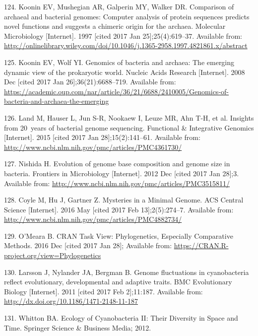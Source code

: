 \documentclass[12pt,twoside]{reedthesis}
\begin{document}
  \hypertarget{ref-koonin_comparison_1997}{}
  124. Koonin EV, Mushegian AR, Galperin MY, Walker DR. Comparison of
  archaeal and bacterial genomes: Computer analysis of protein sequences
  predicts novel functions and suggests a chimeric origin for the archaea.
  Molecular Microbiology {[}Internet{]}. 1997 {[}cited 2017 Jan
  25{]};25(4):619--37. Available from:
  \url{http://onlinelibrary.wiley.com/doi/10.1046/j.1365-2958.1997.4821861.x/abstract}
  
  \hypertarget{ref-koonin_genomics_2008}{}
  125. Koonin EV, Wolf YI. Genomics of bacteria and archaea: The emerging
  dynamic view of the prokaryotic world. Nucleic Acids Research
  {[}Internet{]}. 2008 Dec {[}cited 2017 Jan 26{]};36(21):6688--719.
  Available from:
  \url{https://academic.oup.com/nar/article/36/21/6688/2410005/Genomics-of-bacteria-and-archaea-the-emerging}
  
  \hypertarget{ref-land_insights_2015}{}
  126. Land M, Hauser L, Jun S-R, Nookaew I, Leuze MR, Ahn T-H, et al.
  Insights from 20~years of bacterial genome sequencing. Functional \&
  Integrative Genomics {[}Internet{]}. 2015 {[}cited 2017 Jan
  28{]};15(2):141--61. Available from:
  \url{http://www.ncbi.nlm.nih.gov/pmc/articles/PMC4361730/}
  
  \hypertarget{ref-nishida_evolution_2012}{}
  127. Nishida H. Evolution of genome base composition and genome size in
  bacteria. Frontiers in Microbiology {[}Internet{]}. 2012 Dec {[}cited
  2017 Jan 28{]};3. Available from:
  \url{http://www.ncbi.nlm.nih.gov/pmc/articles/PMC3515811/}
  
  \hypertarget{ref-coyle_mysteries_2016}{}
  128. Coyle M, Hu J, Gartner Z. Mysteries in a Minimal Genome. ACS
  Central Science {[}Internet{]}. 2016 May {[}cited 2017 Feb
  13{]};2(5):274--7. Available from:
  \url{http://www.ncbi.nlm.nih.gov/pmc/articles/PMC4882734/}
  
  \hypertarget{ref-omeara_cran_2016}{}
  129. O'Meara B. CRAN Task View: Phylogenetics, Especially Comparative
  Methods. 2016 Dec {[}cited 2017 Jan 28{]}; Available from:
  \url{https://CRAN.R-project.org/view=Phylogenetics}
  
  \hypertarget{ref-larsson_genome_2011}{}
  130. Larsson J, Nylander JA, Bergman B. Genome fluctuations in
  cyanobacteria reflect evolutionary, developmental and adaptive traits.
  BMC Evolutionary Biology {[}Internet{]}. 2011 {[}cited 2017 Feb
  2{]};11:187. Available from:
  \url{http://dx.doi.org/10.1186/1471-2148-11-187}
  
  \hypertarget{ref-whitton_ecology_2012}{}
  131. Whitton BA. Ecology of Cyanobacteria II: Their Diversity in Space
  and Time. Springer Science \& Business Media; 2012.
  
\end{document}
